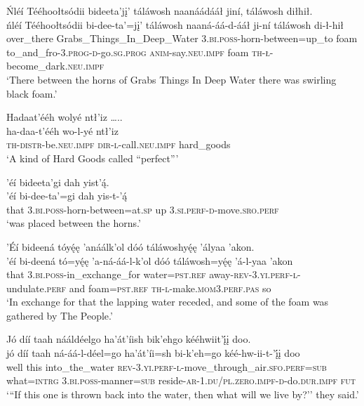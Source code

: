 \ea\label{ex:text4-7-1}
Ńléí Tééhoołtsódii bideeta’jį’ táláwosh naanáádááł jiní, táláwosh diłhił.\\
\gll ńléí	Tééhoołtsódii	bi-dee-ta’=jį’	táláwosh	naaná-áá-d-ááł	ji-ní	táláwosh	di-ł-hił\\
     over\_there	Grabs\_Things\_In\_Deep\_Water	3.\textsc{bi}.\textsc{poss}-horn-between=up\_to	foam	to\_and\_fro-3.\textsc{prog}-\textsc{d}-go.\textsc{sg}.\textsc{prog}	\textsc{anim}-say.\textsc{neu}.\textsc{impf}	foam	\textsc{th}-\textsc{ł}-become\_dark.\textsc{neu}.\textsc{impf}\\
\glt `There between the horns of Grabs Things In Deep Water there was swirling black foam.'
\z

\ea\label{ex:text4-7-2}
Hadaat’ééh wolyé ntł’iz …..\\
\gll ha-daa-t’ééh	wo-l-yé	ntł’iz\\
     \textsc{th}-\textsc{distr}-be.\textsc{neu}.\textsc{impf}	\textsc{dir}-\textsc{l}-call.\textsc{neu}.\textsc{impf}	hard\_goods\\
\glt `A kind of Hard Goods called ``perfect'''
\z

\ea\label{ex:text4-7-3}
’éí bideeta’gi dah yist’ą́.\\
\gll ’éí	bi-dee-ta’=gi	dah	yis-t-’ą́\\
     that	3.\textsc{bi}.\textsc{poss}-horn-between=at.\textsc{sp}	up	3.\textsc{si}.\textsc{perf}-\textsc{d}-move.\textsc{sro}.\textsc{perf}\\
\glt `was placed between the horns.'
\z

\ea\label{ex:text4-7-4}
’Éí bideená tóyę́ę ’anáálk’ol dóó táláwoshyę́ę ’ályaa ’akon.\\
\gll ’éí	bi-deená	tó=yę́ę	’a-ná-áá-l-k’ol	dóó	táláwosh=yę́ę	’á-l-yaa	’akon\\
     that	3.\textsc{bi}.\textsc{poss}-in\_exchange\_for	water=\textsc{pst}.\textsc{ref}	away-\textsc{rev}-3.\textsc{yi}.\textsc{perf}-\textsc{l}-undulate.\textsc{perf}	and	foam=\textsc{pst}.\textsc{ref}	\textsc{th}-\textsc{l}-make.\textsc{mom}3.\textsc{perf}.\textsc{pas}	so\\
\glt `In exchange for that the lapping water receded, and some of the foam was gathered by The People.'
\z

\ea\label{ex:text4-7-5}
Jó díí taah nááldéelgo ha’át’íish bik’ehgo kééhwiit’į́į doo.\\
\gll jó	díí	taah	ná-áá-l-déel=go	ha’át’íi=sh	bi-k’eh=go	kéé-hw-ii-t-’į́į	doo\\
     well	this	into\_the\_water	\textsc{rev}-3.\textsc{yi}.\textsc{perf}-\textsc{l}-move\_through\_air.\textsc{sfo}.\textsc{perf}=\textsc{sub}	what=\textsc{intrg}	3.\textsc{bi}.\textsc{poss}-manner=\textsc{sub}	reside-\textsc{ar}-1.\textsc{du}/\textsc{pl}.\textsc{zero}.\textsc{impf}-\textsc{d}-do.\textsc{dur}.\textsc{impf}	\textsc{fut}\\
\glt `{``}If this one is thrown back into the water, then what will we live by?'' they said.'
\z

